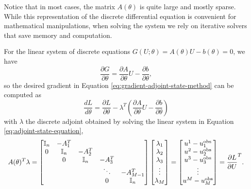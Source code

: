 Notice that in most cases, the matrix $A(\theta)$ is quite large and mostly sparse. 
While this representation of the discrete differential equation is  convenient for mathematical manipulations, when solving the system we rely on iterative solvers that save memory and computation. 

For the linear system of discrete equations $G(U; \theta)=A(\theta) U - b(\theta)=0$, we have 
\begin{equation}
    \frac{\partial G}{\partial \theta} 
    = 
    \frac{\partial A }{\partial \theta} U - \frac{\partial b}{\partial \theta},
\end{equation}
so the desired gradient in Equation \eqref{eq:gradient-adjoint-state-method} can be computed as 
\begin{equation}
    \frac{dL}{d\theta} 
    = 
    \frac{\partial L}{\partial \theta} 
    - 
    \lambda^T \left( \frac{\partial A }{\partial \theta} U - \frac{\partial b}{\partial \theta} \right)
    \label{eq:dhdtheta_linear}
\end{equation}
with $\lambda$ the discrete adjoint obtained by solving the linear system in Equation \eqref{eq:adjoint-state-equation},
\begin{equation}
    A(\theta)^T \lambda 
    =
    \begin{bmatrix}
        \operatorname{\mathbb{I}}_{n} & -A_1^T &   &  & \\
        0 & \operatorname{\mathbb{I}}_{n} & -A_2^T &  &  \\
          & 0 & \operatorname{\mathbb{I}}_{n} & -A_3^T &  \\
         &  &   & \ddots & -A_{M-1}^T  \\
         &  &  & 0 & \operatorname{\mathbb{I}}_{n}
    \end{bmatrix}
    \begin{bmatrix}
        \lambda_1 \\
        \lambda_2 \\
        \lambda_3 \\
        \vdots \\
        \lambda_M
    \end{bmatrix}
    = 
    \begin{bmatrix}
        u^1 - u_1^\text{obs} \\
        u^2 - u_2^\text{obs} \\
        u^3 - u_3^\text{obs} \\
        \vdots \\
        u^M - u_M^\text{obs}     
    \end{bmatrix}
    = 
    \frac{\partial L}{\partial U}^T.
    \label{eq:linea-adjoint-state-equation}
\end{equation}
